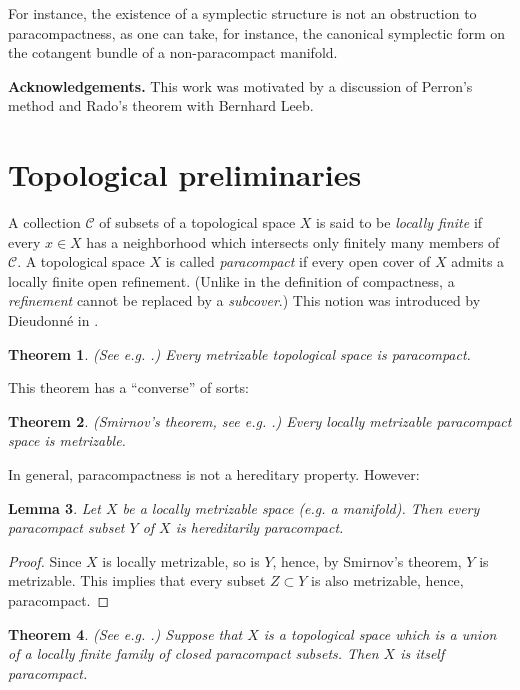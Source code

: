 \documentclass[11pt]{article}   	%
\newtheorem{thm}{Theorem}
\newtheorem{lem}[thm]{Lemma}
\def\cC{\mathcal C}
\begin{document}
For instance, the existence of a symplectic structure is not an obstruction to paracompactness, as one can take, for instance, 
 the canonical symplectic form on the cotangent bundle of a non-paracompact manifold. 
 
 \medskip
{\bf Acknowledgements.} This work was motivated by a discussion of Perron's method and Rado's theorem with Bernhard Leeb. 

\section{Topological preliminaries}

A collection $\cC$ of subsets  of a topological space $X$ is said to be {\em locally finite} if every $x\in X$ has a neighborhood which intersects only 
finitely many members of $\cC$. 
A topological space $X$ is called {\em paracompact} if every open cover of $X$ admits a locally finite open refinement. (Unlike in the definition of 
compactness, a {\em refinement} cannot be replaced by a {\em subcover}.) This notion was introduced by Dieudonn\'e in \cite{D}. 

\begin{thm}
(See e.g. \cite[Theorem 5.1.3]{Engelking}.)  
Every metrizable topological space is paracompact. 
\end{thm}

This theorem has a ``converse'' of sorts:

\begin{thm}
 (Smirnov's theorem, see e.g. \cite[5.4.A]{Engelking}.) 
Every locally metrizable paracompact space is metrizable. 
\end{thm} 



In general, paracompactness is not a hereditary property. However:  

\begin{lem}
Let $X$ be a locally metrizable space (e.g. a manifold). Then every paracompact subset $Y$ of $X$ is hereditarily paracompact. 
\end{lem}
\begin{proof} Since $X$ is locally metrizable, so is $Y$, hence, by Smirnov's theorem, $Y$ is metrizable. 
This implies that every subset $Z\subset Y$ is also metrizable, hence, paracompact. 
\end{proof}


\begin{thm}
(See e.g. \cite[Theorem 5.1.34]{Engelking}.) Suppose that $X$ is a topological space which is a union of a 
locally finite family of closed paracompact subsets. Then $X$ is itself paracompact. 
\end{thm}
\end{document}
